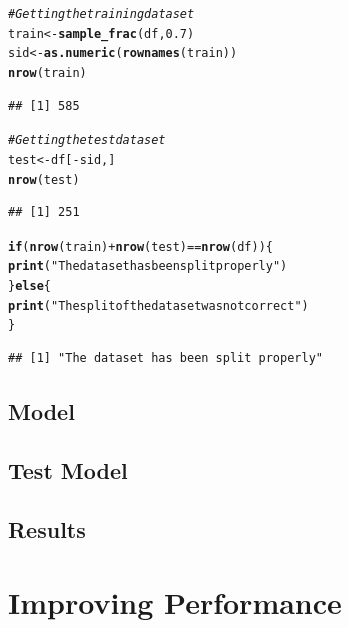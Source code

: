 \documentclass[a4paper,12pt]{article}\usepackage[]{graphicx}\usepackage[]{color}
\makeatletter
\newcommand{\hlnum}[1]{\textcolor[rgb]{0.686,0.059,0.569}{#1}}%
\newcommand{\hlstr}[1]{\textcolor[rgb]{0.192,0.494,0.8}{#1}}%
\newcommand{\hlcom}[1]{\textcolor[rgb]{0.678,0.584,0.686}{\textit{#1}}}%
\newcommand{\hlopt}[1]{\textcolor[rgb]{0,0,0}{#1}}%
\newcommand{\hlstd}[1]{\textcolor[rgb]{0.345,0.345,0.345}{#1}}%
\newcommand{\hlkwa}[1]{\textcolor[rgb]{0.161,0.373,0.58}{\textbf{#1}}}%
\newcommand{\hlkwb}[1]{\textcolor[rgb]{0.69,0.353,0.396}{#1}}%
\newcommand{\hlkwd}[1]{\textcolor[rgb]{0.737,0.353,0.396}{\textbf{#1}}}%
\newenvironment{kframe}{%
 \def\at@end@of@kframe{}%
 \ifinner\ifhmode%
  \def\at@end@of@kframe{\end{minipage}}%
  \begin{minipage}{\columnwidth}%
 \fi\fi%
 \def\FrameCommand##1{\hskip\@totalleftmargin \hskip-\fboxsep
 \colorbox{shadecolor}{##1}\hskip-\fboxsep
     \hskip-\linewidth \hskip-\@totalleftmargin \hskip\columnwidth}%
 \MakeFramed {\advance\hsize-\width
   \@totalleftmargin\z@ \linewidth\hsize
   \@setminipage}}%
 {\par\unskip\endMakeFramed%
 \at@end@of@kframe}
\newenvironment{knitrout}{}{} %
\makeatother
\begin{document}
\begin{knitrout}
\color{fgcolor}\begin{kframe}
\begin{alltt}
\hlcom{# Getting the training dataset}
\hlstd{train}\hlkwb{<-}\hlkwd{sample_frac}\hlstd{( df ,} \hlnum{0.7}\hlstd{)}
\hlstd{sid}\hlkwb{<-}\hlkwd{as.numeric}\hlstd{(}\hlkwd{rownames}\hlstd{(train))}
\hlkwd{nrow}\hlstd{(train)}
\end{alltt}
\begin{verbatim}
## [1] 585
\end{verbatim}
\begin{alltt}
\hlcom{# Getting the test dataset}
\hlstd{test} \hlkwb{<-} \hlstd{df[}\hlopt{-}\hlstd{sid,]}
\hlkwd{nrow}\hlstd{(test)}
\end{alltt}
\begin{verbatim}
## [1] 251
\end{verbatim}
\begin{alltt}
\hlkwa{if} \hlstd{(} \hlkwd{nrow}\hlstd{(train)} \hlopt{+} \hlkwd{nrow}\hlstd{(test)} \hlopt{==} \hlkwd{nrow}\hlstd{(df) )\{}
  \hlkwd{print}\hlstd{(}\hlstr{"The dataset has been split properly"}\hlstd{)}
\hlstd{\}} \hlkwa{else} \hlstd{\{}
  \hlkwd{print}\hlstd{(}\hlstr{"The split of the dataset was not correct"}\hlstd{)}
\hlstd{\}}
\end{alltt}
\begin{verbatim}
## [1] "The dataset has been split properly"
\end{verbatim}
\end{kframe}
\end{knitrout}

\clearpage

\subsection{Model}\label{model}


\subsection{Test Model}\label{testing}
\subsection{Results}\label{results}

\clearpage

\section{Improving Performance}\label{improving_performance}
\end{document}
